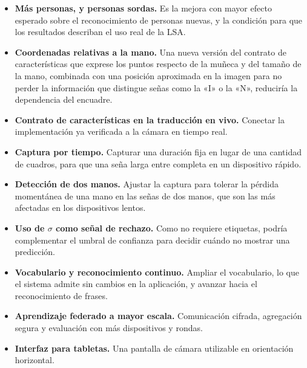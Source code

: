\begin{itemize}
    \item \textbf{Más personas, y personas sordas.} Es la mejora con mayor efecto esperado sobre el reconocimiento de personas nuevas, y la condición para que los resultados describan el uso real de la LSA.
    \item \textbf{Coordenadas relativas a la mano.} Una nueva versión del contrato de características que exprese los puntos respecto de la muñeca y del tamaño de la mano, combinada con una posición aproximada en la imagen para no perder la información que distingue señas como la «I» o la «N», reduciría la dependencia del encuadre.
    \item \textbf{Contrato de características en la traducción en vivo.} Conectar la implementación ya verificada a la cámara en tiempo real.
    \item \textbf{Captura por tiempo.} Capturar una duración fija en lugar de una cantidad de cuadros, para que una seña larga entre completa en un dispositivo rápido.
    \item \textbf{Detección de dos manos.} Ajustar la captura para tolerar la pérdida momentánea de una mano en las señas de dos manos, que son las más afectadas en los dispositivos lentos.
    \item \textbf{Uso de $\sigma$ como señal de rechazo.} Como no requiere etiquetas, podría complementar el umbral de confianza para decidir cuándo no mostrar una predicción.
    \item \textbf{Vocabulario y reconocimiento continuo.} Ampliar el vocabulario, lo que el sistema admite sin cambios en la aplicación, y avanzar hacia el reconocimiento de frases.
    \item \textbf{Aprendizaje federado a mayor escala.} Comunicación cifrada, agregación segura y evaluación con más dispositivos y rondas.
    \item \textbf{Interfaz para tabletas.} Una pantalla de cámara utilizable en orientación horizontal.
\end{itemize}

